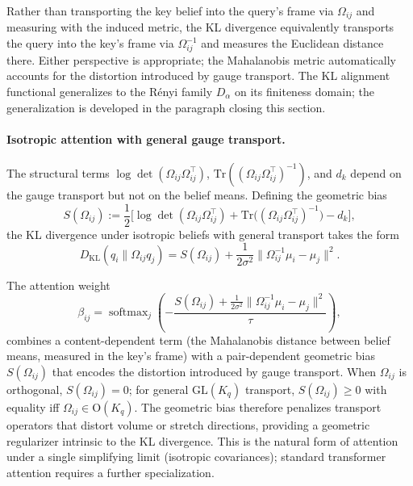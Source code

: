 \documentclass[11pt]{article}
\begin{document}
Rather than transporting the key belief into the query's frame via $\Omega_{ij}$ and measuring with the induced metric, the KL divergence equivalently transports the query into the key's frame via $\Omega_{ij}^{-1}$ and measures the Euclidean distance there. Either perspective is appropriate; the Mahalanobis metric automatically accounts for the distortion introduced by gauge transport. The KL alignment functional generalizes to the R\'enyi family $D_\alpha$ on its finiteness domain; the generalization is developed in the paragraph closing this section.

\paragraph{Isotropic attention with general gauge transport.}

The structural terms $\log\det(\Omega_{ij}\Omega_{ij}^\top)$, $\mathrm{Tr}((\Omega_{ij}\Omega_{ij}^\top)^{-1})$, and $d_k$ depend on the gauge transport but not on the belief means. Defining the geometric bias
\begin{equation}
S(\Omega_{ij}) := \frac{1}{2}\Big[\log\det(\Omega_{ij}\Omega_{ij}^\top) + \mathrm{Tr}\big((\Omega_{ij}\Omega_{ij}^\top)^{-1}\big) - d_k\Big],
\end{equation}
the KL divergence under isotropic beliefs with general transport takes the form
\begin{equation}
D_{\mathrm{KL}}(q_i \| \Omega_{ij} q_j) = S(\Omega_{ij}) + \frac{1}{2\sigma^2}\|\Omega_{ij}^{-1}\mu_i - \mu_j\|^2.
\end{equation}

The attention weight
\begin{equation}
\beta_{ij} = \operatorname{softmax}_j\left(-\frac{S(\Omega_{ij}) + \frac{1}{2\sigma^2}\|\Omega_{ij}^{-1}\mu_i - \mu_j\|^2}{\tau}\right),
\end{equation}
combines a content-dependent term (the Mahalanobis distance between belief means, measured in the key's frame) with a pair-dependent geometric bias $S(\Omega_{ij})$ that encodes the distortion introduced by gauge transport. When $\Omega_{ij}$ is orthogonal, $S(\Omega_{ij}) = 0$; for general $\mathrm{GL}(K_q)$ transport, $S(\Omega_{ij}) \geq 0$ with equality iff $\Omega_{ij} \in \mathrm{O}(K_q)$. The geometric bias therefore penalizes transport operators that distort volume or stretch directions, providing a geometric regularizer intrinsic to the KL divergence. This is the natural form of attention under a single simplifying limit (isotropic covariances); standard transformer attention requires a further specialization.
\end{document}
